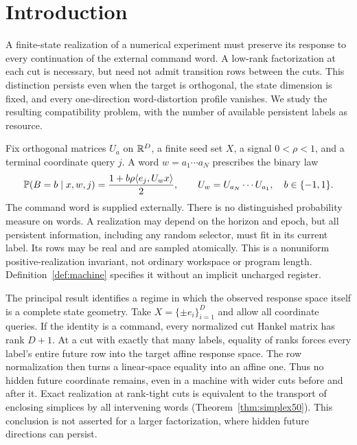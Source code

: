 \section{Introduction}
A finite-state realization of a numerical experiment must preserve its
response to every continuation of the external command word. A low-rank
factorization at each cut is necessary, but need not admit transition
rows between the cuts. This distinction persists even when the target
is orthogonal, the state dimension is fixed, and every one-direction
word-distortion profile vanishes. We study the resulting compatibility
problem, with the number of available persistent labels as resource.

Fix orthogonal matrices $U_a$ on $\mathbb R^D$, a finite seed set $X$, a signal
$0<\rho<1$, and a terminal coordinate query $j$. A word
$w=a_1\cdots a_N$ prescribes the binary law
\begin{equation}\label{eq:target}
 \mathbb P(B=b\mid x,w,j)=\frac{1+b\rho\langle e_j,U_wx\rangle}{2},
 \qquad U_w=U_{a_N}\cdots U_{a_1},\quad b\in\{-1,1\}.
\end{equation}
The command word is supplied externally. There is no distinguished
probability measure on words. A realization may depend on the horizon
and epoch, but all persistent information, including any random selector,
must fit in its current label. Its rows may be real and are sampled
atomically. This is a nonuniform positive-realization invariant, not
ordinary workspace or program length. Definition~\ref{def:machine}
specifies it without an implicit uncharged register.

The principal result identifies a regime in which the observed response
space itself is a complete state geometry. Take $X=\{\pm e_i\}_{i=1}^D$
and allow all coordinate queries. If the identity is a command, every
normalized cut Hankel matrix has rank $D+1$. At a cut with exactly that
many labels, equality of ranks forces every label's entire future row
into the target affine response space. The row normalization then turns
a linear-space equality into an affine one. Thus no hidden future
coordinate remains, even in a machine with wider cuts before and after
it. Exact realization at rank-tight cuts is equivalent to the transport
of enclosing simplices by all intervening words
(Theorem~\ref{thm:simplex50}). This conclusion is not asserted for a
larger factorization, where hidden future directions can persist.

